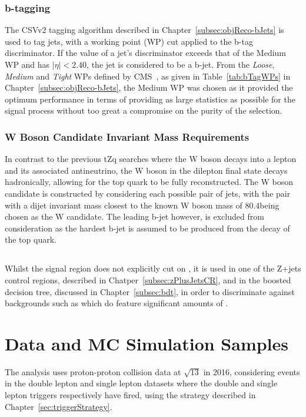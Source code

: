 \subsubsection{b-tagging}
The CSVv2 tagging algorithm described in Chapter~\ref{subsec:objReco-bJets} is used to tag jets, with a working point (WP) cut applied to the b-tag discriminator.
If the value of a jet's discriminator exceeds that of the Medium WP and has $|\eta| < 2.40$, the jet is considered to be a b-jet.
From the \emph{Loose}, \emph{Medium} and \emph{Tight} WPs defined by CMS~\cite{Sirunyan:2017ezt}, as given in Table~\ref{tab:bTagWPs} in Chapter~\ref{subsec:objReco-bJets}, the Medium WP was chosen as it provided the optimum performance in terms of providing as large statistics as possible for the signal process without too great a compromise on the purity of the selection.

\subsubsection{W Boson Candidate Invariant Mass Requirements}
In contrast to the previous tZq searches where the W boson decays into a lepton and its associated antineutrino, the W boson in the dilepton final state decays hadronically, allowing for the top quark to be fully reconstructed.
The W boson candidate is constructed by considering each possible pair of jets, with the pair with a dijet invariant mass closest to the known W boson mass of 80.4\GeVcc being chosen as the W candidate.
The leading b-jet however, is excluded from consideration as the hardest b-jet is assumed to be produced from the decay of the top quark. 

\subsection{\MET}\label{subsec:met}
Whilst the signal region does not explicitly cut on \MET, it is used in one of the Z+jets control regions, described in Chatper~\ref{subsec:zPlusJetsCR}, and in the boosted decision tree, discussed in Chapter~\ref{subsec:bdt}, in order to discriminate against backgrounds such as \ttbar which do feature significant amounts of \MET.

\section{Data and MC Simulation Samples}\label{sec:samples}
The analysis uses proton-proton collision data at $\sqrt{13}$ in 2016, considering events in the double lepton and single lepton datasets where the double and single lepton triggers respectively have fired, using the strategy described in Chapter~\ref{sec:triggerStrategy}.

